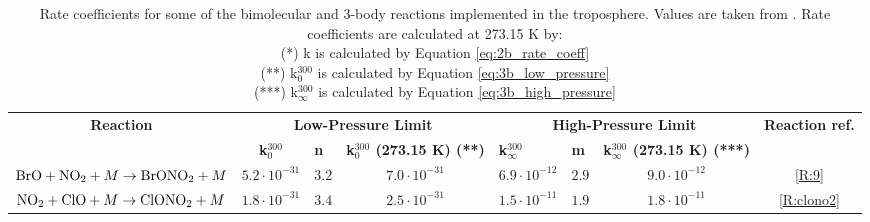 \begin{table}[ht]
{\begin{tabular}{|c|ccc|c|c|c|l|}
\multirow{2}{*}{\textbf{Reaction}}                                   & \multicolumn{3}{c}{\textbf{Low-Pressure Limit}}                                                                          & \multicolumn{3}{c|}{\textbf{High-Pressure Limit}}                                                                             & \multirow{2}{*}{\textbf{Reaction ref.}} \\ \cline{2-7}
                                                                     & \multicolumn{1}{c|}{\textbf{k$_0^{300}$}} & \multicolumn{1}{l|}{\textbf{n}} & \multicolumn{1}{l|}{\textbf{k$_0^{300}$ (273.15 K) (**)}} & \multicolumn{1}{l|}{\textbf{k$_\infty^{300}$}} & \multicolumn{1}{l|}{\textbf{m}} & \multicolumn{1}{l|}{\textbf{k$_\infty^{300}$ (273.15 K) (***)}} &                                         \\ \hline
$\mathrm{BrO} + \mathrm{NO_2} + M \rightarrow \mathrm{BrONO_2} + M$        & \multicolumn{1}{c|}{$5.2\cdot10^{-31}$}   & \multicolumn{1}{c|}{$3.2$}      & $7.0\cdot10^{-31}$                         & $6.9\cdot10^{-12}$                             & $2.9$                           & $9.0\cdot10^{-12}$                         & \multicolumn{1}{c|}{\ref{R:9}}          \\
$\mathrm{NO_2} + \mathrm{ClO} + M \rightarrow \mathrm{ClONO_2} + M $       & \multicolumn{1}{c|}{$1.8\cdot10^{-31}$}   & \multicolumn{1}{c|}{$3.4$}      & $2.5\cdot10^{-31}$                         & $1.5\cdot10^{-11}$                             & $1.9$                           & $1.8\cdot10^{-11}$                         & \multicolumn{1}{c|}{\ref{R:clono2}}     \\ \hline
\end{tabular}
}
\caption{Rate coefficients for some of the bimolecular and 3-body reactions implemented in the troposphere. Values are taken from \cite{JPL}. Rate coefficients are calculated at 273.15 K by: 
\\ 
(*) k is calculated by Equation \ref{eq:2b_rate_coeff} 
\\ 
(**) k$_0^{300}$ is calculated by Equation \ref{eq:3b_low_pressure} 
\\ 
(***) k$_\infty^{300}$ is calculated by Equation \ref{eq:3b_high_pressure}} 
\label{tab:2b_and_3b_reactions}
\end{table}